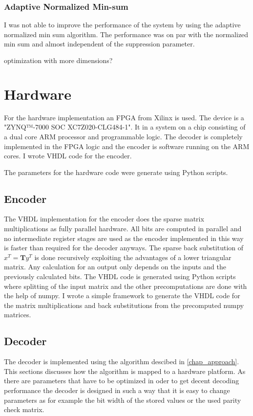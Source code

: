 \subsubsection{Adaptive Normalized Min-sum}
I was not able to improve the performance of the system by using the adaptive normalized min sum algorithm. The performance was on par with the normalized min sum and almost independent of the suppression parameter. 

optimization with more dimensions?

\section{Hardware}
For the hardware implementation an FPGA from Xilinx is used. The device is a "ZYNQ™-7000 SOC XC7Z020-CLG484-1". It in a system on a chip consisting of a dual core ARM processor and programmable logic. The decoder is completely implemented in the FPGA logic and the encoder is software running on the ARM cores. I wrote VHDL code for the encoder.

The parameters for the hardware code were generate using Python scripts.

\subsection{Encoder}
The VHDL implementation for the encoder does the sparse matrix multiplications as fully parallel hardware. All bits are computed in parallel and no intermediate register stages are used as the encoder implemented in this way is faster than required for the decoder anyways. The sparse back substitution of $x^T = \bm{T}y^T$ is done recursively exploiting the advantages of a lower triangular matrix. Any calculation for an output only depends on the inputs and the previously calculated bits. The VHDL code is generated using Python scripts where splitting of the input matrix and the other precomputations are done with the help of numpy. I wrote a simple framework to generate the VHDL code for the matrix multiplications and back substitutions from the precomputed numpy matrices. 

\subsection{Decoder}
The decoder is implemented using the algorithm descibed in \cref{chap_approach}. This sections discusses how the algorithm is mapped to a hardware platform. As there are parameters that have to be optimized in oder to get decent decoding performance the decoder is designed in such a way that it is easy to change parameters as for example the bit width of the stored values or the used parity check matrix. 

